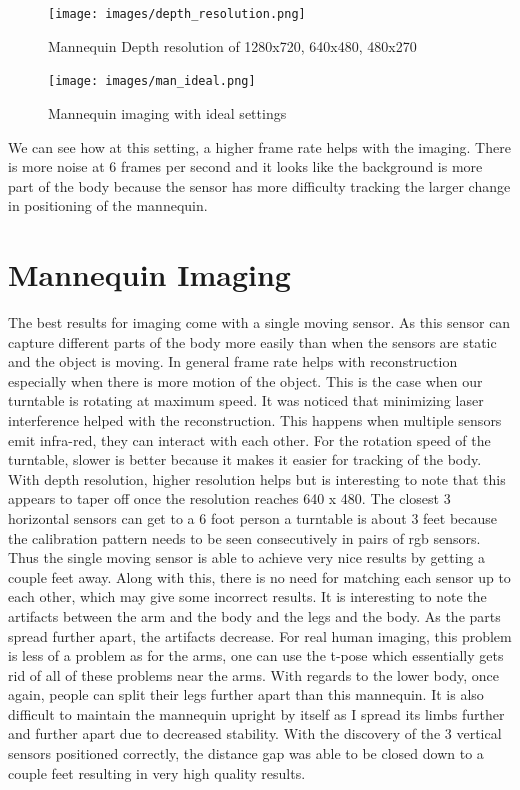 \begin{figure}[!htb]
	\caption{Mannequin Depth resolution of 1280x720, 640x480, 480x270}
	\centering
	\texttt{[image: images/depth\_resolution.png]}
\end{figure}

\begin{figure}[!htb]
	\caption{Mannequin imaging with ideal settings}
	\centering
	\texttt{[image: images/man\_ideal.png]}
\end{figure}



We can see how at this setting, a higher frame rate helps with the imaging. There is more noise at 6 frames per second and it looks like the background is more part of the body because the sensor has more difficulty tracking the larger change in positioning of the mannequin.

\section{Mannequin Imaging}
The best results for imaging come with a single moving sensor. As this sensor can capture different parts of the body more easily than when the sensors are static and the object is moving. In general frame rate helps with reconstruction especially when there is more motion of the object. This is the case when our turntable is rotating at maximum speed. It was noticed that minimizing laser interference helped with the reconstruction. This happens when multiple sensors emit infra-red, they can interact with each other. For the rotation speed of the turntable, slower is better because it makes it easier for tracking of the body. With depth resolution, higher resolution helps but is interesting to note that this appears to taper off once the resolution reaches 640 x 480. The closest 3 horizontal sensors can get to a 6 foot person a turntable is about 3 feet because the calibration pattern needs to be seen consecutively in pairs of rgb sensors. Thus the single moving sensor is able to achieve very nice results by getting a couple feet away. Along with this, there is no need for matching each sensor up to each other, which may give some incorrect results. It is interesting to note the artifacts between the arm and the body and the legs and the body. As the parts spread further apart, the artifacts decrease. For real human imaging, this problem is less of a problem as for the arms, one can use the t-pose which essentially gets rid of all of these problems near the arms. With regards to the lower body, once again, people can split their legs further apart than this mannequin. It is also difficult to maintain the mannequin upright by itself as I spread its limbs further and further apart due to decreased stability. With the discovery of the 3 vertical sensors positioned correctly, the distance gap was able to be closed down to a couple feet resulting in very high quality results.

